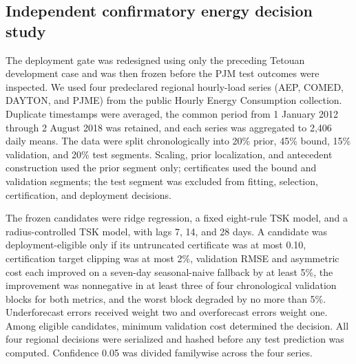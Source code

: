 \subsection{Independent confirmatory energy decision study}
The deployment gate was redesigned using only the preceding Tetouan development case and was then frozen before the PJM test outcomes were inspected. We used four predeclared regional hourly-load series (AEP, COMED, DAYTON, and PJME) from the public Hourly Energy Consumption collection. Duplicate timestamps were averaged, the common period from 1 January 2012 through 2 August 2018 was retained, and each series was aggregated to 2,406 daily means. The data were split chronologically into 20\% prior, 45\% bound, 15\% validation, and 20\% test segments. Scaling, prior localization, and antecedent construction used the prior segment only; certificates used the bound and validation segments; the test segment was excluded from fitting, selection, certification, and deployment decisions.

The frozen candidates were ridge regression, a fixed eight-rule TSK model, and a radius-controlled TSK model, with lags 7, 14, and 28 days. A candidate was deployment-eligible only if its untruncated certificate was at most 0.10, certification target clipping was at most 2\%, validation RMSE and asymmetric cost each improved on a seven-day seasonal-naive fallback by at least 5\%, the improvement was nonnegative in at least three of four chronological validation blocks for both metrics, and the worst block degraded by no more than 5\%. Underforecast errors received weight two and overforecast errors weight one. Among eligible candidates, minimum validation cost determined the decision. All four regional decisions were serialized and hashed before any test prediction was computed. Confidence 0.05 was divided familywise across the four series.
